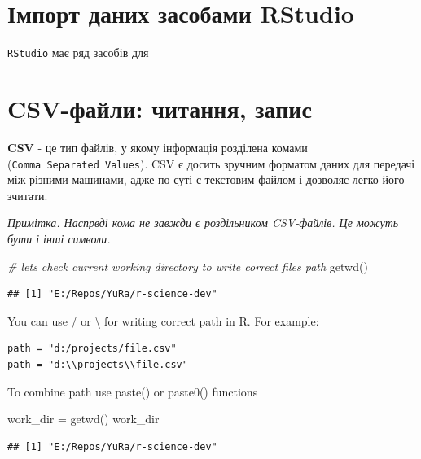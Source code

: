 \documentclass[
]{book}
\newenvironment{Shaded}{\begin{snugshade}}{\end{snugshade}}
\newcommand{\CommentTok}[1]{\textcolor[rgb]{0.56,0.35,0.01}{\textit{#1}}}
\newcommand{\FunctionTok}[1]{\textcolor[rgb]{0.00,0.00,0.00}{#1}}
\newcommand{\NormalTok}[1]{#1}
\newcommand{\OtherTok}[1]{\textcolor[rgb]{0.56,0.35,0.01}{#1}}
\begin{document}
\hypertarget{chapter321}{%
\section{Імпорт даних засобами RStudio}\label{chapter321}}

\texttt{RStudio} має ряд засобів для

\hypertarget{chapter43}{%
\section{CSV-файли: читання, запис}\label{chapter43}}

\textbf{CSV} - це тип файлів, у якому інформація розділена комами (\texttt{Comma\ Separated\ Values}). CSV є досить зручним форматом даних для передачі між різними машинами, адже по суті є текстовим файлом і дозволяє легко його зчитати.

\emph{Примітка. Наспрвді кома не завжди є роздільником CSV-файлів. Це можуть бути і інші символи.}

\begin{Shaded}
\begin{Highlighting}[]
\CommentTok{\# lets check current working directory to write correct files path}
\FunctionTok{getwd}\NormalTok{()}
\end{Highlighting}
\end{Shaded}

\begin{verbatim}
## [1] "E:/Repos/YuRa/r-science-dev"
\end{verbatim}

You can use / or \textbackslash{} for writing correct path in R. For example:

\begin{verbatim}
path = "d:/projects/file.csv"
path = "d:\\projects\\file.csv"
\end{verbatim}

To combine path use paste() or paste0() functions

\begin{Shaded}
\begin{Highlighting}[]
\NormalTok{work\_dir }\OtherTok{=} \FunctionTok{getwd}\NormalTok{()}
\NormalTok{work\_dir }
\end{Highlighting}
\end{Shaded}

\begin{verbatim}
## [1] "E:/Repos/YuRa/r-science-dev"
\end{verbatim}
\end{document}
